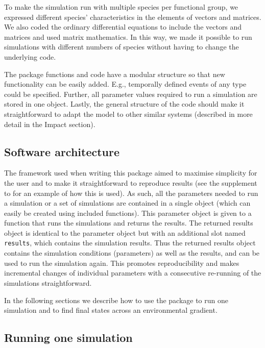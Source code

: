 \documentclass[]{elsarticle} %
\begin{document}
To make the simulation run with multiple species per functional group, we expressed different species' characteristics in the elements of vectors and matrices. We also coded the ordinary differential equations to include the vectors and matrices and used matrix mathematics. In this way, we made it possible to run simulations with different numbers of species without having to change the underlying code.

The package functions and code have a modular structure so that new functionality can be easily added. E.g., temporally defined events of any type could be specified. Further, all parameter values required to run a simulation are stored in one object. Lastly, the general structure of the code should make it straightforward to adapt the model to other similar systems (described in more detail in the Impact section).

\subsection{Software architecture}\label{software-architecture}

The framework used when writing this package aimed to maximise simplicity for the user and to make it straightforward to reproduce results (see the supplement \citep{Petchey2022} to \citet{Limberger2023} for an example of how this is used). As such, all the parameters needed to run a simulation or a set of simulations are contained in a single object (which can easily be created using included functions). This parameter object is given to a function that runs the simulations and returns the results. The returned results object is identical to the parameter object but with an additional slot named \texttt{results}, which contains the simulation results. Thus the returned results object contains the simulation conditions (parameters) as well as the results, and can be used to run the simulation again. This promotes reproducibility and makes incremental changes of individual parameters with a consecutive re-running of the simulations straightforward.

In the following sections we describe how to use the package to run one simulation and to find final states across an environmental gradient.

\subsection{Running one simulation}\label{running-one-simulation}
\end{document}
